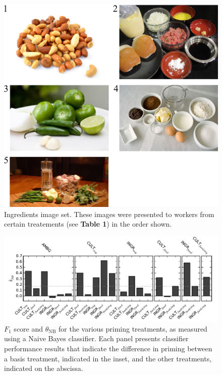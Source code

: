 \documentclass[a4paper]{report}
\begin{document}
\begin{figure}
	\includegraphics[scale=1.00]{figs/taskImages/ingredients.png}
	\caption{ Ingredients image set. These images were presented to workers 
		from certain treatements (see \textbf{Table 1}) in the order shown.}
\end{figure}

\begin{figure}
	\includegraphics{figs/f1-thetas_full_pairwise25_img1.pdf}
	\caption{ $F_1$ score and $\theta_\text{NB}$ for the various 
priming treatments, as measured using a Naive Bayes classifier. Each panel 
presents classifier performance results that indicate the difference in
priming between a basis 
treatment, indicated in the inset, and the other treatments, indicated on the
abscissa. }
\end{figure}
\end{document}
